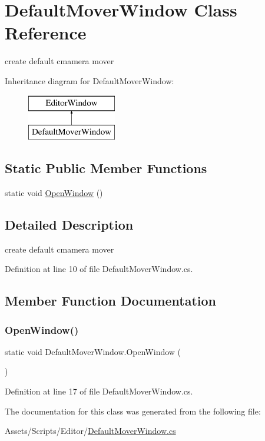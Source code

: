 \hypertarget{class_default_mover_window}{}\section{Default\+Mover\+Window Class Reference}
\label{class_default_mover_window}


create default cmamera mover  


Inheritance diagram for Default\+Mover\+Window\+:\begin{figure}[H]
\begin{center}
\leavevmode
\includegraphics[height=2.000000cm]{class_default_mover_window}
\end{center}
\end{figure}
\subsection*{Static Public Member Functions}
\begin{DoxyCompactItemize}
\item 
static void \mbox{\hyperlink{class_default_mover_window_a58d8efdfbf2c21eaa55bc202ac8ae56e}{Open\+Window}} ()
\end{DoxyCompactItemize}


\subsection{Detailed Description}
create default cmamera mover 



Definition at line 10 of file Default\+Mover\+Window.\+cs.



\subsection{Member Function Documentation}
\mbox{\label{class_default_mover_window_a58d8efdfbf2c21eaa55bc202ac8ae56e}} 
\subsubsection{\texorpdfstring{Open\+Window()}{OpenWindow()}}
{\footnotesize\ttfamily static void Default\+Mover\+Window.\+Open\+Window (\begin{DoxyParamCaption}{ }\end{DoxyParamCaption})\hspace{0.3cm}{\ttfamily [static]}}



Definition at line 17 of file Default\+Mover\+Window.\+cs.



The documentation for this class was generated from the following file\+:\begin{DoxyCompactItemize}
\item 
Assets/\+Scripts/\+Editor/\mbox{\hyperlink{_default_mover_window_8cs}{Default\+Mover\+Window.\+cs}}\end{DoxyCompactItemize}
